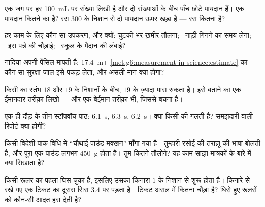 \begin{exercise}[$\star$]\label{exo:g6:measurement-in-science:4}
एक जग पर हर \qty{100}{mL} पर संख्या लिखी है और दो संख्याओं के बीच
पाँच छोटे पायदान हैं। एक पायदान कितने का है? रस $300$ के निशान से दो
पायदान ऊपर खड़ा है --- रस कितना है?
\end{exercise}

\begin{exercise}[$\star$]\label{exo:g6:measurement-in-science:5}
हर काम के लिए कौन-सा उपकरण, और क्यों: चुटकी भर ख़मीर तौलना; \ नाड़ी
गिनने का समय लेना; \ इस पन्ने की चौड़ाई; \ स्कूल के मैदान की लंबाई?
\end{exercise}

\begin{exercise}[$\star$]\label{exo:g6:measurement-in-science:6}
नादिया अपनी पेंसिल मापती है: \qty{17.4}{m}।
\cref{met:g6:measurement-in-science:estimate} का कौन-सा सुरक्षा-जाल
इसे पकड़ लेता, और असली मान क्या होगा?
\end{exercise}

\begin{exercise}[$\star$]\label{exo:g6:measurement-in-science:7}
किसी  का स्तंभ $18$ और $19$ के निशानों के बीच, $19$ के
ज़्यादा पास रुकता है। इसे बताने का एक ईमानदार तरीक़ा लिखो --- और एक
बेईमान तरीक़ा भी, जिससे बचना है।
\end{exercise}

\begin{exercise}[$\star$]\label{exo:g6:measurement-in-science:8}
एक ही दौड़ के तीन स्टॉपवॉच-पाठ: \qty{6.1}{s}, \qty{6.3}{s},
\qty{6.2}{s}। क्या किसी की ग़लती है? समझदारी वाली रिपोर्ट क्या
होगी?
\end{exercise}

\begin{exercise}[$\star\star$]\label{exo:g6:measurement-in-science:9}
किसी विदेशी पाक-विधि में ``चौथाई पाउंड मक्खन'' माँगा गया है।
तुम्हारी रसोई की तराज़ू  की भाषा बोलती है, और पूरा एक पाउंड लगभग
\qty{450}{g} होता है। तुम कितने  तौलोगे? यह काम साझा मात्रकों
के बारे में क्या सिखाता है?
\end{exercise}

\begin{exercise}[$\star\star$]\label{exo:g6:measurement-in-science:10}
किसी रूलर का पहला  घिस चुका है, इसलिए उसका किनारा $1$ के
निशान से शुरू होता है। किनारे से रखे गए एक टिकट का दूसरा सिरा $3.4$
पर पड़ता है। टिकट असल में कितना चौड़ा है? घिसे हुए रूलरों को कौन-सी
आदत हरा देती है?
\end{exercise}

